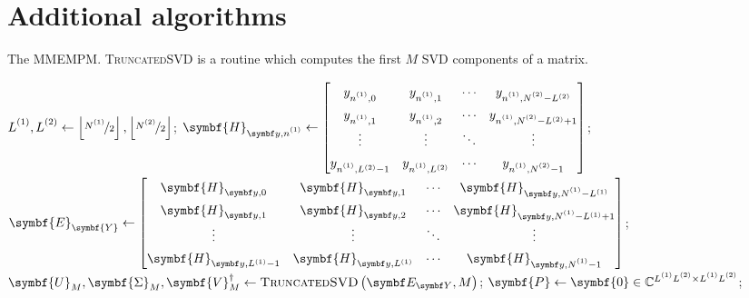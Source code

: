 \section{Additional algorithms}
\label{sec:algs}
\begin{algorithm}[h!]
    \caption[
        The \acs{MMEMPM}.
    ]{
        The \acs{MMEMPM}. \textsc{TruncatedSVD} is a routine which computes the
        first $M$ \ac{SVD} components of a matrix.
    }
    \label{alg:mmempm}
    \begin{algorithmic}[1]
        \State $\Lone, \Ltwo \gets \left\lfloor \nicefrac{\None}{2} \right\rfloor, \left\lfloor \nicefrac{\Ntwo}{2} \right\rfloor$;
            \State  $\symbf{H}_{\by,\none} \gets
                \def\arraystretch{1.4}
            \begin{bmatrix}
                y_{\none, 0} &
                y_{\none, 1} &
                \cdots &
                y_{\none, \Ntwo-L^{(2)}}\\
                y_{\none, 1} &
                y_{\none, 2} &
                \cdots &
                y_{\none, \Ntwo-L^{(2)}+1}\\
                \vdots & \vdots & \ddots & \vdots\\
                y_{\none, L^{(2)} - 1} &
                y_{\none, L^{(2)}} &
                \cdots &
                y_{\none, \Ntwo-1}
            \end{bmatrix}
        $;
        \EndFor
        \State $\symbf{E}_{\symbf{Y}} \gets
        \begin{bmatrix}
            \symbf{H}_{\by,0} & \symbf{H}_{\by,1} & \cdots & \symbf{H}_{\by,\None - L^{(1)}}\\
            \symbf{H}_{\by,1} & \symbf{H}_{\by,2} & \cdots & \symbf{H}_{\by,\None - L^{(1)} + 1}\\
            \vdots & \vdots & \ddots & \vdots\\
            \symbf{H}_{\by,L^{(1)} - 1} & \symbf{H}_{\by,L^{(1)}} & \cdots & \symbf{H}_{\by,\None - 1}
        \end{bmatrix}
        $;
        \State $\symbf{U}_M^{\vphantom{\dagger}},
            \symbf{\Sigma}_M^{\vphantom{\dagger}},
            \symbf{V}_M^{\dagger} \gets
            \textsc{TruncatedSVD}\left(\EY, M\right)$;
        \State $\symbf{P} \gets \symbf{0} \in \mathbb{C}^{\Lone \Ltwo \times \Lone \Ltwo}$;

\end{algorithmic}
\end{algorithm}
